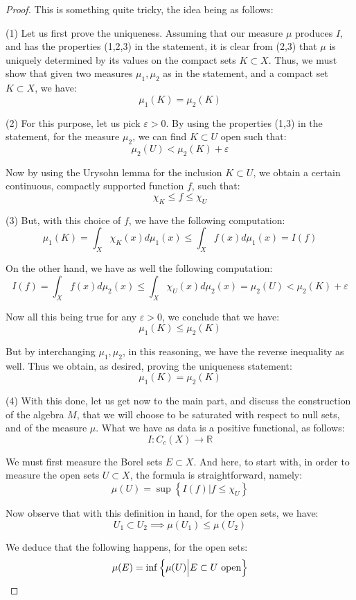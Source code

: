 \documentclass[12pt]{amsbook}
\begin{document}
\begin{proof}
This is something quite tricky, the idea being as follows:

\medskip

(1) Let us first prove the uniqueness. Assuming that our measure $\mu$ produces $I$, and has the properties (1,2,3) in the statement, it is clear from (2,3) that $\mu$ is uniquely determined by its values on the compact sets $K\subset X$. Thus, we must show that given two measures $\mu_1,\mu_2$ as in the statement, and a compact set $K\subset X$, we have:
$$\mu_1(K)=\mu_2(K)$$

(2) For this purpose, let us pick $\varepsilon>0$. By using the properties (1,3) in the statement, for the measure $\mu_2$, we can find $K\subset U$ open such that:
$$\mu_2(U)<\mu_2(K)+\varepsilon$$

Now by using the Urysohn lemma for the inclusion $K\subset U$, we obtain a certain continuous, compactly supported function $f$, such that:
$$\chi_K\leq f\leq\chi_U$$

(3) But, with this choice of $f$, we have the following computation:
$$\mu_1(K)
=\int_X\chi_K(x)d\mu_1(x)
\leq\int_Xf(x)d\mu_1(x)
=I(f)$$

On the other hand, we have as well the following computation:
$$I(f)
=\int_Xf(x)d\mu_2(x)
\leq\int_X\chi_U(x)d\mu_2(x)
=\mu_2(U)
<\mu_2(K)+\varepsilon$$

Now all this being true for any $\varepsilon>0$, we conclude that we have:
$$\mu_1(K)\leq\mu_2(K)$$

But by interchanging $\mu_1,\mu_2$, in this reasoning, we have the reverse inequality as well. Thus we obtain, as desired, proving the uniqueness statement:
$$\mu_1(K)=\mu_2(K)$$

(4) With this done, let us get now to the main part, and discuss the construction of the algebra $M$, that we will choose to be saturated with respect to null sets, and of the measure $\mu$. What we have as data is a positive functional, as follows:
$$I:C_c(X)\to\mathbb R$$

We must first measure the Borel sets $E\subset X$. And here, to start with, in order to measure the open sets $U\subset X$, the formula is straightforward, namely:
$$\mu(U)=\sup\left\{I(f)\Big| f\leq\chi_U\right\}$$

Now observe that with this definition in hand, for the open sets, we have:
$$U_1\subset U_2\implies\mu(U_1)\leq\mu(U_2)$$

We deduce that the following happens, for the open sets:
$$\mu(E)=\inf\left\{\mu(U)\Big| E\subset U\ {\rm open}\right\}$$


\end{proof}
\end{document}
